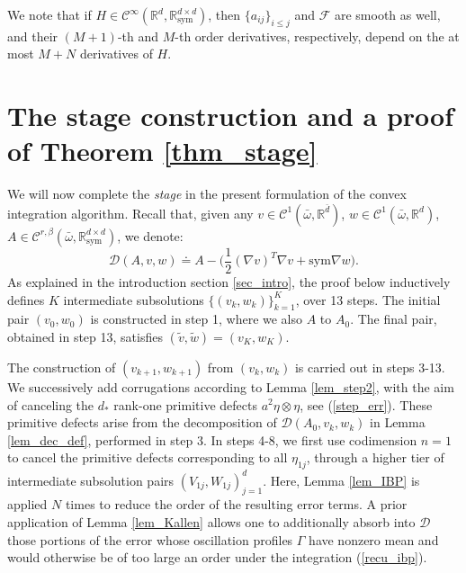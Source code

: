 \documentclass[reqno,twoside,11pt]{amsart}
\newcommand{\sym}{\mathrm{sym}}
\newcommand{\R}{\mathbb{R}}
\numberwithin{equation}{section}
\theoremstyle{plain}
\theoremstyle{definition}
\begin{document}
\smallskip

\noindent We note that if $H\in \mathcal{C}^\infty(\R^d,\R^{d\times d}_\sym)$, then
$\{a_{ij}\}_{i\leq j}$ and $\mathcal{F}$ are smooth as well, and their $(M+1)$-th and $M$-th
order derivatives, respectively, depend on the at most $M+N$ derivatives of $H$. 

\medskip

\section{The stage construction and a proof of Theorem \ref{thm_stage}} \label{sec_khamsa} 

We will now complete the {\em stage} in the present formulation of the 
convex integration algorithm. Recall that, given any
$v\in\mathcal{C}^1(\bar\omega,\R^{\bar d})$, 
$w\in\mathcal{C}^1(\bar\omega,\R^{d})$, 
$A\in\mathcal{C}^{r,\beta}(\bar\omega,\R^{d\times d}_\sym)$, we denote:
$$\mathcal{D}(A, v, w) \doteq A - \big(\frac{1}{2}(\nabla v)^T\nabla v +
\sym\nabla w\big).$$
As explained in the introduction section \ref{sec_intro}, the proof below inductively defines $K$
intermediate subsolutions $\{(v_k, w_k)\}_{k=1}^K$, over 13
steps. The initial pair $(v_0, w_0)$ is constructed in step 1, where we
also $A$ to $A_0$. The final pair, obtained in step 13, satisfies $(\tilde v, \tilde w) = (v_K, w_K)$. 

\medskip

\noindent The construction of $(v_{k+1}, w_{k+1})$ from $(v_k, w_k)$ is carried
out in steps 3-13. We successively add corrugations according to Lemma
\ref{lem_step2}, with the aim of canceling the
$d_*$ rank-one primitive defects $a^2 \eta \otimes
\eta$, see (\ref{step_err}). These primitive defects arise from the
decomposition of $\mathcal{D}(A_0, v_k, w_k)$ in Lemma \ref{lem_dec_def},
performed in step 3. In steps 4-8, we first use codimension $n=1$ to
cancel the primitive defects corresponding to all $\eta_{1j}$,
through a higher tier of intermediate subsolution pairs
${(V_{1j}, W_{1j})}_{j=1}^d$. Here, Lemma \ref{lem_IBP} is
applied $N$ times to reduce the order of the resulting error terms. A
prior application of Lemma \ref{lem_Kallen} allows one to additionally
absorb into $\mathcal{D}$ those portions of the error whose
oscillation profiles $\Gamma$ have nonzero mean and would otherwise be
of too large an order under the integration (\ref{recu_ibp}). 

\medskip
\end{document}
